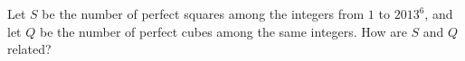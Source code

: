 Let $S$ be the number of perfect squares among the integers from $1$ to $2013^6$, and let $Q$ be the number of perfect cubes among the same integers. How are $S$ and $Q$ related?
